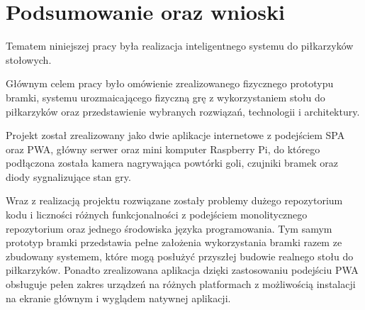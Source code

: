 \chapter{Podsumowanie oraz wnioski}
\label{ch:funplenop}

Tematem niniejszej pracy była realizacja inteligentnego systemu do piłkarzyków stołowych.

Głównym celem pracy było omówienie zrealizowanego fizycznego prototypu bramki, systemu urozmaicającego fizyczną grę z wykorzystaniem stołu do piłkarzyków oraz przedstawienie wybranych rozwiązań, technologii i architektury.

Projekt został zrealizowany jako dwie aplikacje internetowe z podejściem SPA oraz PWA, główny serwer oraz mini komputer Raspberry Pi, do którego podłączona została kamera nagrywająca powtórki goli, czujniki bramek oraz diody sygnalizujące stan gry.

Wraz z realizacją projektu rozwiązane zostały problemy dużego repozytorium kodu i liczności różnych funkcjonalności z podejściem monolitycznego repozytorium oraz jednego środowiska języka programowania. Tym samym prototyp bramki przedstawia pełne założenia wykorzystania bramki razem ze zbudowany systemem, które mogą posłużyć przyszłej budowie realnego stołu do piłkarzyków. Ponadto zrealizowana aplikacja dzięki zastosowaniu podejściu PWA obsługuje pełen zakres urządzeń na różnych platformach z możliwością instalacji na ekranie głównym i wyglądem natywnej aplikacji.